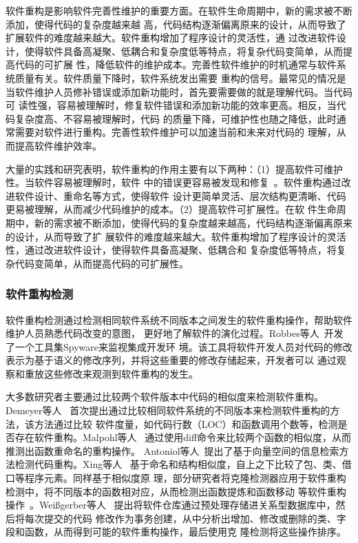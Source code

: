 软件重构是影响软件完善性维护的重要方面。在软件生命周期中，新的需求被不断添加，使得代码的复杂度越来越
高，代码结构逐渐偏离原来的设计，从而导致了扩展软件的难度越来越大。软件重构增加了程序设计的灵活性，通
过改进软件设计，使得软件具备高凝聚、低耦合和复杂度低等特点，将复杂代码变简单，从而提高代码的可扩展
性，降低软件的维护成本。完善性软件维护的时机通常与软件系统质量有关。软件质量下降时，软件系统发出需要
重构的信号。最常见的情况是当软件维护人员修补错误或添加新功能时，首先要需要做的就是理解代码。当代码可
读性强，容易被理解时，修复软件错误和添加新功能的效率更高。相反，当代码复杂度高、不容易被理解时，代码
的质量下降，可维护性也随之降低，此时通常需要对软件进行重构。完善性软件维护可以加速当前和未来对代码的
理解，从而提高软件维护效率。

大量的实践和研究表明，软件重构的作用主要有以下两种：（1）提高软件可维护性。当软件容易被理解时，软件
中的错误更容易被发现和修复~\cite{martin2009clean}。软件重构通过改进软件设计、重命名等方式，使得软件
设计更简单灵活、层次结构更清晰、代码更易被理解，从而减少代码维护的成本。（2）提高软件可扩展性。在软
件生命周期中，新的需求被不断添加，使得代码的复杂度越来越高，代码结构逐渐偏离原来的设计，从而导致了扩
展软件的难度越来越大。软件重构增加了程序设计的灵活性，通过改进软件设计，使得软件具备高凝聚、低耦合和
复杂度低等特点，将复杂代码变简单，从而提高代码的可扩展性。
\subsubsection{软件重构检测}

软件重构检测通过检测相同软件系统不同版本之间发生的软件重构操作，帮助软件维护人员熟悉代码改变的意图，
更好地了解软件的演化过程。Robbes等人~\cite{robbes2008spyware}开发了一个工具集Spyware来监视集成开发环
境。该工具将软件开发人员对代码的修改表示为基于语义的修改序列，并将这些重要的修改存储起来，开发者可以
通过观察和重放这些修改来观测到软件重构的发生。

大多数研究者主要通过比较两个软件版本中代码的相似度来检测软件重构。Demeyer等人
~\cite{demeyer2000finding}首次提出通过比较相同软件系统的不同版本来检测软件重构的方法，该方法通过比较
软件度量，如代码行数（LOC）和函数调用个数等，检测是否存在软件重构。Malpohl等人
~\cite{malpohl2003renaming}通过使用diff命令来比较两个函数的相似度，从而推测出函数重命名的重构操作。
Antoniol等人~\cite{antoniol2004automatic}提出了基于向量空间的信息检索方法检测代码重构。Xing等人
~\cite{xing2005umldiff}基于命名和结构相似度，自上之下比较了包、类、借口等程序元素。同样基于相似度原
理，部分研究者将克隆检测器应用于软件重构检测中，将不同版本的函数相对应，从而检测出函数提炼和函数移动
等软件重构操作~\cite{van2003reconstruction,kim2005functions}。Weißgerber等人
~\cite{weissgerber2006identifying}提出将软件仓库通过预处理存储进关系型数据库中，然后将每次提交的代码
修改作为事务创建，从中分析出增加、修改或删除的类、字段和函数，从而得到可能的软件重构操作，最后使用克
隆检测将这些操作排序。

